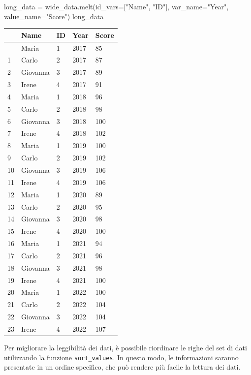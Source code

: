 \documentclass[
  letterpaper,
  krantz2]{{[}./krantz{]}}
\newenvironment{Shaded}{\begin{snugshade}}{\end{snugshade}}
\newcommand{\NormalTok}[1]{\textcolor[rgb]{0.00,0.23,0.31}{#1}}
\newcommand{\OperatorTok}[1]{\textcolor[rgb]{0.37,0.37,0.37}{#1}}
\newcommand{\StringTok}[1]{\textcolor[rgb]{0.13,0.47,0.30}{#1}}
\begin{document}
\begin{Shaded}
\begin{Highlighting}[]
\NormalTok{long\_data }\OperatorTok{=}\NormalTok{ wide\_data.melt(id\_vars}\OperatorTok{=}\NormalTok{[}\StringTok{"Name"}\NormalTok{, }\StringTok{"ID"}\NormalTok{], var\_name}\OperatorTok{=}\StringTok{"Year"}\NormalTok{, value\_name}\OperatorTok{=}\StringTok{"Score"}\NormalTok{)}
\NormalTok{long\_data}
\end{Highlighting}
\end{Shaded}

\begin{longtable}[]{@{}lllll@{}}
\toprule\noalign{}
& Name & ID & Year & Score \\
\midrule\noalign{}
\endhead
\bottomrule\noalign{}
\endlastfoot
0 & Maria & 1 & 2017 & 85 \\
1 & Carlo & 2 & 2017 & 87 \\
2 & Giovanna & 3 & 2017 & 89 \\
3 & Irene & 4 & 2017 & 91 \\
4 & Maria & 1 & 2018 & 96 \\
5 & Carlo & 2 & 2018 & 98 \\
6 & Giovanna & 3 & 2018 & 100 \\
7 & Irene & 4 & 2018 & 102 \\
8 & Maria & 1 & 2019 & 100 \\
9 & Carlo & 2 & 2019 & 102 \\
10 & Giovanna & 3 & 2019 & 106 \\
11 & Irene & 4 & 2019 & 106 \\
12 & Maria & 1 & 2020 & 89 \\
13 & Carlo & 2 & 2020 & 95 \\
14 & Giovanna & 3 & 2020 & 98 \\
15 & Irene & 4 & 2020 & 100 \\
16 & Maria & 1 & 2021 & 94 \\
17 & Carlo & 2 & 2021 & 96 \\
18 & Giovanna & 3 & 2021 & 98 \\
19 & Irene & 4 & 2021 & 100 \\
20 & Maria & 1 & 2022 & 100 \\
21 & Carlo & 2 & 2022 & 104 \\
22 & Giovanna & 3 & 2022 & 104 \\
23 & Irene & 4 & 2022 & 107 \\
\end{longtable}

Per migliorare la leggibilità dei dati, è possibile riordinare le righe
del set di dati utilizzando la funzione \texttt{sort\_values}. In questo
modo, le informazioni saranno presentate in un ordine specifico, che può
rendere più facile la lettura dei dati.
\end{document}
